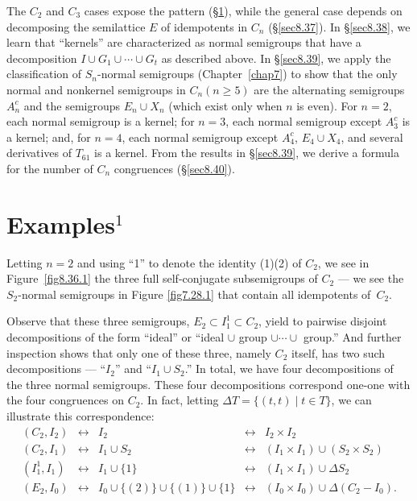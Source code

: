 \documentclass{surv-l}
\numberwithin{equation}{section}
\numberwithin{table}{section}
\numberwithin{figure}{section}
\theoremstyle{definition}
\begin{document}
The $C_{2}$ and $C_{3}$ cases expose the pattern
(\S\ref{sec8.36}), while the general case depends on decomposing
the semilattice $E$ of idempotents in $C_{n}$ (\S\ref{sec8.37}).
In \S\ref{sec8.38}, we learn that ``kernels'' are characterized as
normal semigroups that have a decomposition $I \cup
G_{1}\cup\cdots\cup G_{t}$ as described above. In \S\ref{sec8.39},
we apply the classification of $S_{n}$-normal semigroups
(Chapter~\ref{chap7}) to show that the only normal and nonkernel
semigroups in $C_{n} (n\geq 5)$ are the alternating semigroups
$A_{n}^{c}$ and the semigroups $E_{n}\cup X_{n}$ (which exist only
when $n$ is even). For $n =2$, each normal semigroup is a kernel;
for $n =3$, each normal semigroup except $A_{3}^{c}$ is a kernel;
and, for $n =4$, each normal semigroup except $A_{4}^{c}$,
$E_{4}\cup X_{4}$, and several derivatives of $T_{61}$ is a kernel.
From the results in \S\ref{sec8.39}, we derive a formula for the
number of $C_{n}$ congruences (\S\ref{sec8.40}).

\setcounter{section}{35}

\section{Examples$^{1}$}\label{sec8.36}

Letting $n =2$ and using ``1'' to
denote the identity (1)(2) of $C_{2}$, we see in
Figure~\ref{fig8.36.1} the three full self-conjugate subsemigroups
of $C_{2}$ --- we see the $S_{2}$-normal semigroups in Figure
\ref{fig7.28.1} that contain all idempotents of~$C_{2}$.

\noindent Observe that these three semigroups, $E_{2}\subset
I_{1}^{1}\subset C_{2}$, yield to pairwise disjoint decompositions
of the form ``ideal'' or ``ideal $\cup$ group $\cup\cdots\cup$
group.'' And further inspection shows that only one of these
three, namely $C_{2}$ itself, has two such decompositions ---
``$I_{2}$'' and ``$I_{1}\cup S_{2}$.'' In total, we have four
decompositions of the three normal semigroups. These four
decompositions correspond one-one with the four congruences on
$C_{2}$. In fact, letting $\Delta T= \{(t, t)\mid t\in
T\}$, we can illustrate this correspondence:
\[
\begin{array}{ccccc}
(C_{2}, I_{2}) &\leftrightarrow &I_{2} &\leftrightarrow &I_{2}\times I_{2} \\
(C_{2}, I_{1}) &\leftrightarrow &I_{1}\cup S_{2} &\leftrightarrow &(I_{1}\times I_{1})\cup(S_{2}\times S_{2})\\
(I_{1}^{1}, I_{1}) &\leftrightarrow &I_{1}\cup\{1\} &\leftrightarrow &(I_{1}\times I_{1})\cup\Delta S_{2}\\
(E_{2}, I_{0}) &\leftrightarrow &I_{0}\cup\{(2)\}\cup\{(1)\}\cup\{1\} &\leftrightarrow &(I_{0}\times I_{0})\cup\Delta(C_{2}-I_{0}).
\end{array}
\]
\end{document}
